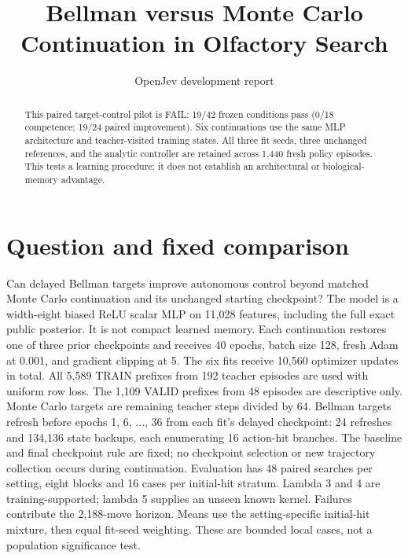 \documentclass[10pt]{article}
\title{Bellman versus Monte Carlo Continuation in Olfactory Search}
\author{OpenJev development report}\date{}
\begin{document}
\maketitle
\begin{abstract}
This paired target-control pilot is FAIL: 19/42 frozen conditions pass (0/18 competence; 19/24 paired improvement). Six continuations use the same MLP architecture and teacher-visited training states. All three fit seeds, three unchanged references, and the analytic controller are retained across 1,440 fresh policy episodes. This tests a learning procedure; it does not establish an architectural or biological-memory advantage.
\end{abstract}
\section{Question and fixed comparison}
Can delayed Bellman targets improve autonomous control beyond matched Monte Carlo continuation and its unchanged starting checkpoint? The model is a width-eight biased ReLU scalar MLP on 11,028 features, including the full exact public posterior. It is not compact learned memory. Each continuation restores one of three prior checkpoints and receives 40 epochs, batch size 128, fresh Adam at 0.001, and gradient clipping at 5. The six fits receive 10,560 optimizer updates in total.
All 5,589 TRAIN prefixes from 192 teacher episodes are used with uniform row loss. The 1,109 VALID prefixes from 48 episodes are descriptive only. Monte Carlo targets are remaining teacher steps divided by 64. Bellman targets refresh before epochs 1, 6, ..., 36 from each fit's delayed checkpoint: 24 refreshes and 134,136 state backups, each enumerating 16 action-hit branches. The baseline and final checkpoint rule are fixed; no checkpoint selection or new trajectory collection occurs during continuation.
Evaluation has 48 paired searches per setting, eight blocks and 16 cases per initial-hit stratum. Lambda 3 and 4 are training-supported; lambda 5 supplies an unseen known kernel. Failures contribute the 2,188-move horizon. Means use the setting-specific initial-hit mixture, then equal fit-seed weighting. These are bounded local cases, not a population significance test.
\end{document}
